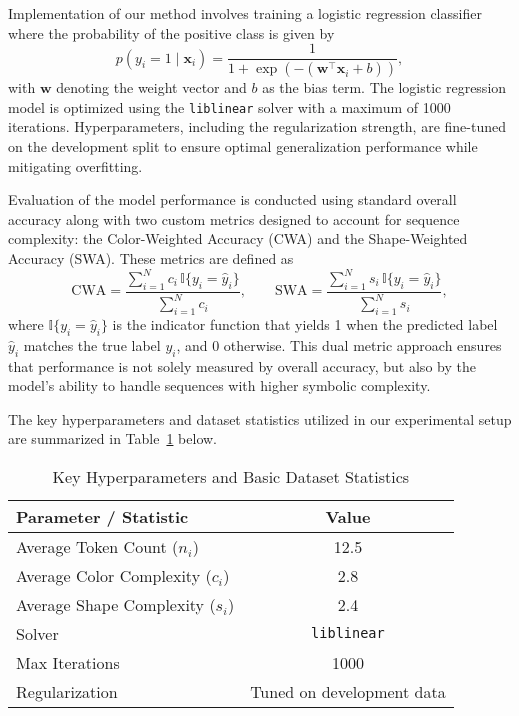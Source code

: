 \documentclass{article}
\begin{document}
Implementation of our method involves training a logistic regression classifier where the probability of the positive class is given by
\[
p(y_i = 1 \mid \mathbf{x}_i) = \frac{1}{1+\exp\left(-\left(\mathbf{w}^{\top}\mathbf{x}_i + b\right)\right)},
\]
with \(\mathbf{w}\) denoting the weight vector and \(b\) as the bias term. The logistic regression model is optimized using the \texttt{liblinear} solver with a maximum of 1000 iterations. Hyperparameters, including the regularization strength, are fine-tuned on the development split to ensure optimal generalization performance while mitigating overfitting.

Evaluation of the model performance is conducted using standard overall accuracy along with two custom metrics designed to account for sequence complexity: the Color-Weighted Accuracy (CWA) and the Shape-Weighted Accuracy (SWA). These metrics are defined as
\[
\text{CWA} = \frac{\sum_{i=1}^{N} c_i\, \mathbb{I}\{y_i = \hat{y}_i\}}{\sum_{i=1}^{N} c_i}, \qquad
\text{SWA} = \frac{\sum_{i=1}^{N} s_i\, \mathbb{I}\{y_i = \hat{y}_i\}}{\sum_{i=1}^{N} s_i},
\]
where \(\mathbb{I}\{y_i = \hat{y}_i\}\) is the indicator function that yields 1 when the predicted label \(\hat{y}_i\) matches the true label \(y_i\), and 0 otherwise. This dual metric approach ensures that performance is not solely measured by overall accuracy, but also by the model’s ability to handle sequences with higher symbolic complexity.

The key hyperparameters and dataset statistics utilized in our experimental setup are summarized in Table~\ref{tab:exp_params} below.

\begin{table}[h]
\centering
\begin{tabular}{|l|c|}
\hline
\textbf{Parameter / Statistic} & \textbf{Value} \\
\hline
Average Token Count (\(n_i\)) & 12.5 \\
Average Color Complexity (\(c_i\)) & 2.8 \\
Average Shape Complexity (\(s_i\)) & 2.4 \\
Solver & \texttt{liblinear} \\
Max Iterations & 1000 \\
Regularization & Tuned on development data \\
\hline
\end{tabular}
\caption{Key Hyperparameters and Basic Dataset Statistics}
\label{tab:exp_params}
\end{table}
\end{document}
